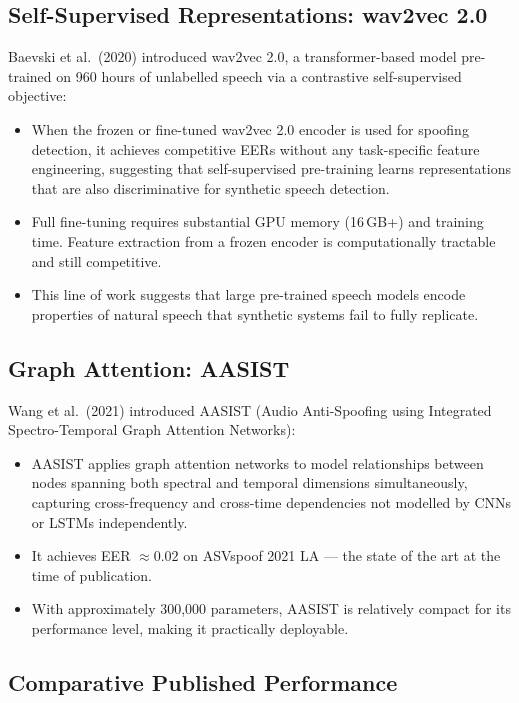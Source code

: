 \documentclass[12pt,a4paper]{article}
\begin{document}
\subsection{Self-Supervised Representations: wav2vec 2.0}

Baevski et al.\ (2020) introduced wav2vec 2.0, a transformer-based model pre-trained
on 960 hours of unlabelled speech via a contrastive self-supervised objective:

\begin{itemize}
  \item When the frozen or fine-tuned wav2vec 2.0 encoder is used for spoofing detection,
    it achieves competitive EERs without any task-specific feature engineering, suggesting
    that self-supervised pre-training learns representations that are also discriminative
    for synthetic speech detection.
  \item Full fine-tuning requires substantial GPU memory (16\,GB+) and training time.
    Feature extraction from a frozen encoder is computationally tractable and still
    competitive.
  \item This line of work suggests that large pre-trained speech models encode
    properties of natural speech that synthetic systems fail to fully replicate.
\end{itemize}

\subsection{Graph Attention: AASIST}

Wang et al.\ (2021) introduced AASIST (Audio Anti-Spoofing using Integrated
Spectro-Temporal Graph Attention Networks):

\begin{itemize}
  \item AASIST applies graph attention networks to model relationships between nodes
    spanning both spectral and temporal dimensions simultaneously, capturing
    cross-frequency and cross-time dependencies not modelled by CNNs or LSTMs
    independently.
  \item It achieves EER $\approx 0.02$ on ASVspoof 2021 LA --- the state of the art
    at the time of publication.
  \item With approximately 300,000 parameters, AASIST is relatively compact for its
    performance level, making it practically deployable.
\end{itemize}

\subsection{Comparative Published Performance}
\end{document}
